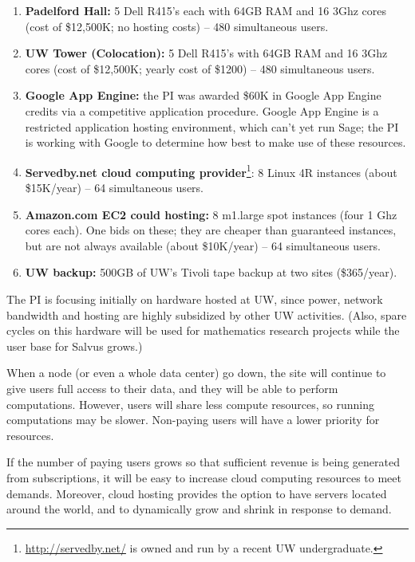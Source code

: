 \documentclass[11pt]{article}
\begin{document}
\begin{enumerate}
\item {\bf Padelford Hall:} 5 Dell R415's each with 64GB RAM
  and 16 3Ghz cores (cost of \$12,500K; no hosting costs) --
  480 simultaneous users. 

\item {\bf UW Tower (Colocation):} 5 Dell R415's with
  64GB RAM and 16 3Ghz cores (cost of \$12,500K; yearly
  cost of \$1200) -- 480 simultaneous users. 

\item {\bf Google App Engine:} the PI was awarded \$60K in Google App
  Engine credits via a competitive application procedure.  Google App
  Engine is a restricted application hosting environment, which can't
  yet run Sage; the PI is working with Google to determine how best to
  make use of these resources.

\item {\bf Servedby.net cloud computing
  provider}\footnote{\url{http://servedby.net/} is owned and run by a
  recent UW undergraduate.}: 8 Linux 4R instances (about \$15K/year)
  -- 64 simultaneous users.

\item {\bf Amazon.com EC2 could hosting:} 8 m1.large spot instances
  (four 1 Ghz cores each).  One bids on these; they are cheaper than
  guaranteed instances, but are not always available (about
  \$10K/year) -- 64 simultaneous users.

\item {\bf UW backup:} 500GB of UW's Tivoli tape backup
  at two sites (\$365/year).

\end{enumerate}

The PI is focusing initially on hardware hosted at UW, since power,
network bandwidth and hosting are highly subsidized by other UW
activities.  (Also, spare cycles on this hardware will be used for
mathematics research projects while the user base for Salvus grows.)

When a node (or even a whole data center) go down, the site will
continue to give users full access to their data, and they will be
able to perform computations.  However, users will share less compute
resources, so running computations may be slower.  Non-paying users
will have a lower priority for resources.

If the number of paying users grows so that sufficient revenue is
being generated from subscriptions, it will be easy to increase cloud
computing resources to meet demands.  Moreover, cloud
hosting provides the option to have servers located around the world,
and to dynamically grow and shrink in response to demand.
\end{document}

